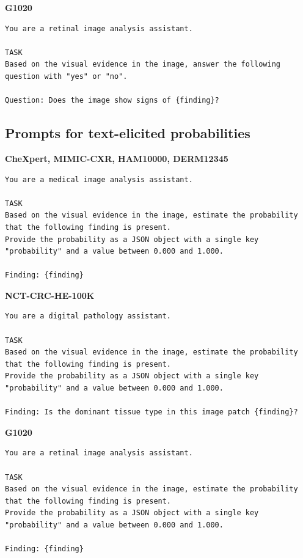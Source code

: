 \noindent\begin{minipage}{\linewidth}
\textbf{G1020}
\begin{lstlisting}
You are a retinal image analysis assistant.

TASK
Based on the visual evidence in the image, answer the following question with "yes" or "no".

Question: Does the image show signs of {finding}?
\end{lstlisting}
\end{minipage}
\medskip

\subsection{Prompts for text-elicited probabilities}
\noindent\begin{minipage}{\linewidth}
\textbf{CheXpert, MIMIC-CXR, HAM10000, DERM12345}
\begin{lstlisting}
You are a medical image analysis assistant.

TASK
Based on the visual evidence in the image, estimate the probability that the following finding is present.
Provide the probability as a JSON object with a single key "probability" and a value between 0.000 and 1.000.

Finding: {finding}
\end{lstlisting}
\end{minipage}
\medskip

\noindent\begin{minipage}{\linewidth}
\textbf{NCT-CRC-HE-100K}
\begin{lstlisting}
You are a digital pathology assistant.

TASK
Based on the visual evidence in the image, estimate the probability that the following finding is present.
Provide the probability as a JSON object with a single key "probability" and a value between 0.000 and 1.000.

Finding: Is the dominant tissue type in this image patch {finding}?
\end{lstlisting}
\end{minipage}
\medskip

\noindent\begin{minipage}{\linewidth}
\textbf{G1020}
\begin{lstlisting}
You are a retinal image analysis assistant.

TASK
Based on the visual evidence in the image, estimate the probability that the following finding is present.
Provide the probability as a JSON object with a single key "probability" and a value between 0.000 and 1.000.

Finding: {finding}
\end{lstlisting}
\end{minipage}
\medskip

